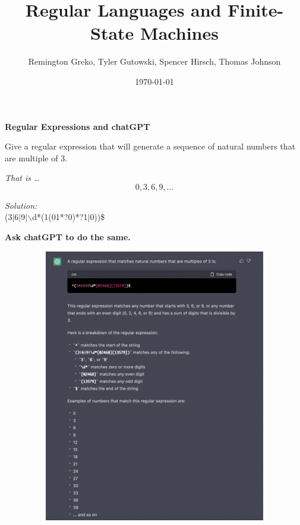 \documentclass{article}
\begin{document}
\title{Regular Languages and Finite-State Machines}
\author{Remington Greko, Tyler Gutowski, Spencer Hirsch, Thomas Johnson}
\date{\today}

\maketitle

\textbf{Regular Expressions and chatGPT}

Give a regular expression that will generate a sequence of natural numbers
that are multiple of 3.

\textit{That is \dots}
\[0, 3, 6, 9, \dots \]

\medskip

\noindent \textit{Solution:} \\
$\hat{}$(3$\mid$6$\mid$9$\mid$$\backslash$d*(1(01*?0)*?1$\mid$0))\$

\medskip

\textbf{Ask chatGPT to do the same.} \\

\smallskip

\includegraphics[width=15cm,height=12cm]{chat} \\

\medskip
\end{document}
